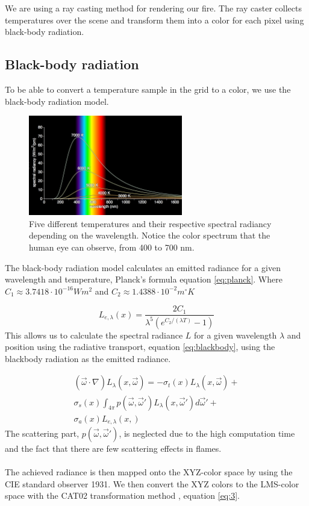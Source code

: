 We are using a ray casting method for rendering our fire. The ray caster collects temperatures over the scene and transform them into a color for each pixel using black-body radiation.
\subsection{Black-body radiation}
	To be able to convert a temperature sample in the grid to a color, we use the black-body radiation model. 


\begin{figure}[h!]
\label{fig:blackbody}
\centering
\includegraphics[width=0.6\textwidth]{blackbody.png}
\caption{Five different temperatures and their respective spectral radiancy depending on the wavelength. Notice the color spectrum that the human eye can observe, from 400 to 700 nm.}
\end{figure}

The black-body radiation model calculates an emitted radiance for a given wavelength and temperature, Planck's formula\cite{Nguyen02} equation \ref{eq:planck}. Where $C_1 \approx 3.7418 \cdot 10^{-16} Wm^2$ and $C_2 \approx 1.4388 \cdot 10^{-2} m^\circ K$

\begin{equation}
\label{eq:planck}
	L_{e,\lambda}(x) = \frac{2C_1}{\lambda^5(e^{C_2/(\lambda T)}-1)}
\end{equation}
This allows us to calculate the spectral radiance $L$ for a given wavelength $\lambda$ and position using the radiative transport, equation \ref{eq:blackbody}, using the blackbody radiation as the emitted radiance. 

\begin{equation}
\label{eq:blackbody}
\begin{split}
	(\vec{\omega}\cdot \nabla)L_\lambda(x,\vec{\omega}) = -\sigma_t(x)L_\lambda(x,\vec{\omega}) + \\ 
\sigma_s(x) \int_{4\pi} p(\vec{\omega},\vec{\omega}')L_\lambda(x,\vec{\omega}')d\vec{\omega}' + \\
\sigma_a(x)L_{e,\lambda}(x,)
\end{split}
\end{equation}
The scattering part, $ p(\vec{\omega},\vec{\omega}')$,  is neglected due to the high computation time and the fact that there are few scattering effects in flames. \\\\
The achieved radiance is then mapped onto the XYZ-color space by using the CIE standard observer 1931\cite{CIE}.
We then convert the XYZ colors to the LMS-color space with the CAT02 transformation method \cite{CAT02}, equation \ref{eq:3}.

